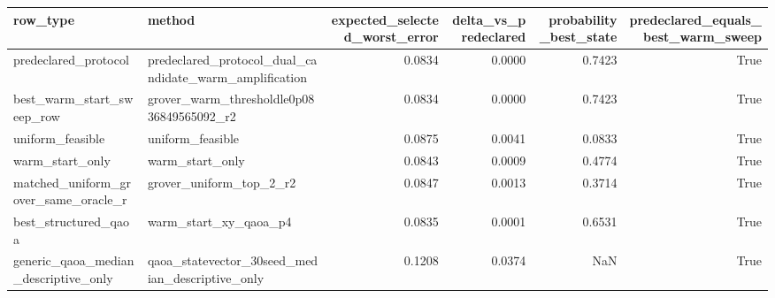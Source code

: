 \begin{tabular}{llrrrr}
\toprule
row\_type & method & expected\_selected\_worst\_error & delta\_vs\_predeclared & probability\_best\_state & predeclared\_equals\_best\_warm\_sweep \\
\midrule
predeclared\_protocol & predeclared\_protocol\_dual\_candidate\_warm\_amplification & 0.0834 & 0.0000 & 0.7423 & True \\
best\_warm\_start\_sweep\_row & grover\_warm\_thresholdle0p0836849565092\_r2 & 0.0834 & 0.0000 & 0.7423 & True \\
uniform\_feasible & uniform\_feasible & 0.0875 & 0.0041 & 0.0833 & True \\
warm\_start\_only & warm\_start\_only & 0.0843 & 0.0009 & 0.4774 & True \\
matched\_uniform\_grover\_same\_oracle\_r & grover\_uniform\_top\_2\_r2 & 0.0847 & 0.0013 & 0.3714 & True \\
best\_structured\_qaoa & warm\_start\_xy\_qaoa\_p4 & 0.0835 & 0.0001 & 0.6531 & True \\
generic\_qaoa\_median\_descriptive\_only & qaoa\_statevector\_30seed\_median\_descriptive\_only & 0.1208 & 0.0374 & NaN & True \\
\bottomrule
\end{tabular}
